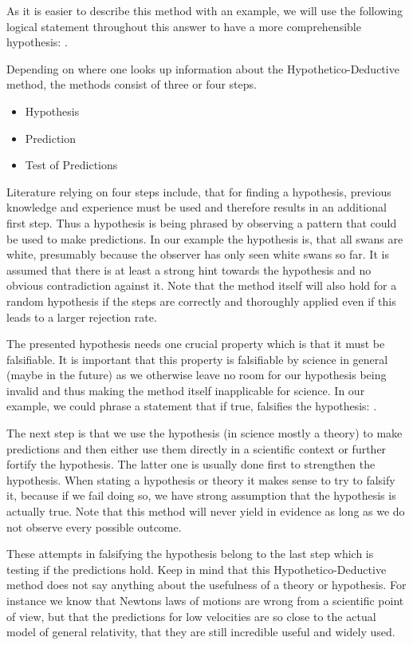 \documentclass[11pt]{scrartcl}
\begin{document}
As it is easier to describe this method with an example, we will use the following logical statement throughout this answer to have a more comprehensible hypothesis: .

Depending on where one looks up information about the Hypothetico-Deductive method, the methods consist of three or four steps.

\begin{itemize}
  \item Hypothesis
  \item Prediction
  \item Test of Predictions
\end{itemize}

Literature relying on four steps include, that for finding a hypothesis, previous knowledge and experience must be used and therefore results in an additional first step. Thus a hypothesis is being phrased by observing a pattern that could be used to make predictions. In our example the hypothesis is, that all swans are white, presumably because the observer has only seen white swans so far. It is assumed that there is at least a strong hint towards the hypothesis and no obvious contradiction against it. Note that the method itself will also hold for a random hypothesis if the steps are correctly and thoroughly applied even if this leads to a larger rejection rate.

The presented hypothesis needs one crucial property which is that it must be falsifiable. It is important that this property is falsifiable by science in general (maybe in the future) as we otherwise leave no room for our hypothesis being invalid and thus making the method itself inapplicable for science. In our example, we could phrase a statement that if true, falsifies the hypothesis: .

The next step is that we use the hypothesis (in science mostly a theory) to make predictions and then either use them directly in a scientific context or further fortify the hypothesis. The latter one is usually done first to strengthen the hypothesis. When stating a hypothesis or theory it makes sense to try to falsify it, because if we fail doing so, we have strong assumption that the hypothesis is actually true. Note that this method will never yield in evidence as long as we do not observe every possible outcome.

These attempts in falsifying the hypothesis belong to the last step which is testing if the predictions hold. Keep in mind that this Hypothetico-Deductive method does not say anything about the usefulness of a theory or hypothesis. For instance we know that Newtons laws of motions are wrong from a scientific point of view, but that the predictions for low velocities are so close to the actual model of general relativity, that they are still incredible useful and widely used.
\end{document}
